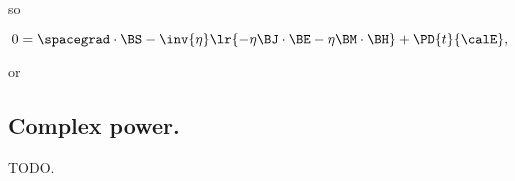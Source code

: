 so

\begin{dmath}\label{eqn:poyntingF:180}
0 = 
\spacegrad \cdot \BS
-
\inv{\eta}
\lr{
- \eta \BJ \cdot \BE
- \eta \BM \cdot \BH
}
+ \PD{t}{\calE},
\end{dmath}

or

\subsection{Complex power.}
TODO.
